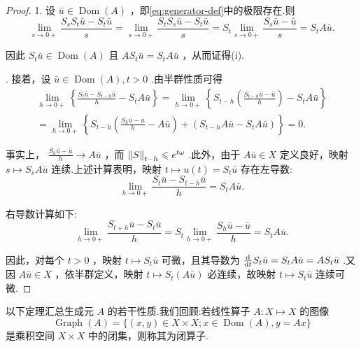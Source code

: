 \begin{proof}
1. 设 $\bar{u} \in  \operatorname{Dom}\left( A\right)$ ，即\eqref{eq:generator-def}中的极限存在.则
\[
\mathop{\lim }\limits_{{s \rightarrow  0 + }}\frac{{S}_{s}{S}_{t}\bar{u} - {S}_{t}\bar{u}}{s} = \mathop{\lim }\limits_{{s \rightarrow  0 + }}\frac{{S}_{t}{S}_{s}\bar{u} - {S}_{t}\bar{u}}{s} = {S}_{t}\mathop{\lim }\limits_{{s \rightarrow  0 + }}\frac{{S}_{s}\bar{u} - \bar{u}}{s} = {S}_{t}A\bar{u}.
\]

因此 ${S}_{t}\bar{u} \in  \operatorname{Dom}\left( A\right)$ 且 $A{S}_{t}\bar{u} = {S}_{t}A\bar{u}$ ，从而证得(i).

. 接着，设 $\bar{u} \in  \operatorname{Dom}\left( A\right) ,t > 0$ .由半群性质可得
\begin{gather*}
\mathop{\lim }\limits_{{h \rightarrow  0 + }}\left\{  {\frac{{S}_{t}\bar{u} - {S}_{t - h}\bar{u}}{h} - {S}_{t}A\bar{u}}\right\}   = \mathop{\lim }\limits_{{h \rightarrow  0 + }}\left\{  {{S}_{t - h}\left( \frac{{S}_{t - h}\bar{u} - \bar{u}}{h}\right)  - {S}_{t}A\bar{u}}\right\}\\
= \mathop{\lim }\limits_{{h \rightarrow  0 + }}\left\{  {{S}_{t - h}\left( {\frac{{S}_{h}\bar{u} - \bar{u}}{h} - A\bar{u}}\right)  + \left( {{S}_{t - h}A\bar{u} - {S}_{t}A\bar{u}}\right) }\right\}   = 0.
\end{gather*}

事实上， $\frac{{S}_{h}\bar{u} - \bar{u}}{h} \rightarrow  A\bar{u}$ ，而 $\norm{S}_{t - h} \leqslant  {e}^{t\omega }$ .此外，由于 $A\bar{u} \in  X$ 定义良好，映射 $s \mapsto  {S}_{s}A\bar{u}$ 连续.上述计算表明，映射 $t \mapsto  u\left( t\right)  = {S}_{t}\bar{u}$ 存在左导数:
\[
\mathop{\lim }\limits_{{h \rightarrow  0 + }}\frac{{S}_{t}\bar{u} - {S}_{t - h}\bar{u}}{h} = {S}_{t}A\bar{u}.
\]

右导数计算如下:
\[
\mathop{\lim }\limits_{{h \rightarrow  0 + }}\frac{{S}_{t + h}\bar{u} - {S}_{t}\bar{u}}{h} = {S}_{t}\mathop{\lim }\limits_{{h \rightarrow  0 + }}\frac{{S}_{h}\bar{u} - \bar{u}}{h} = {S}_{t}A\bar{u}.
\]

因此，对每个 $t > 0$ ，映射 $t \mapsto  {S}_{t}\bar{u}$ 可微，且其导数为 $\frac{\mathop{}\!\mathrm{d}}{\mathop{}\!\mathrm{d} t}{S}_{t}\bar{u} = {S}_{t}A\bar{u} = A{S}_{t}\bar{u}$ .又因 $A\bar{u} \in  X$ ，依半群定义，映射 $t \mapsto  {S}_{t}\left( {A\bar{u}}\right)$ 必连续，故映射 $t \mapsto  {S}_{t}\bar{u}$ 连续可微.
\end{proof}

以下定理汇总生成元 $A$ 的若干性质.我们回顾:若线性算子 $A : X \mapsto  X$ 的图像
\[
\operatorname{Graph}\left( A\right)  = \{ \left( {x,y}\right)  \in  X \times  X;x \in  \operatorname{Dom}\left( A\right) ,y = {Ax}\}
\]
是乘积空间 $X \times  X$ 中的闭集，则称其为闭算子.

